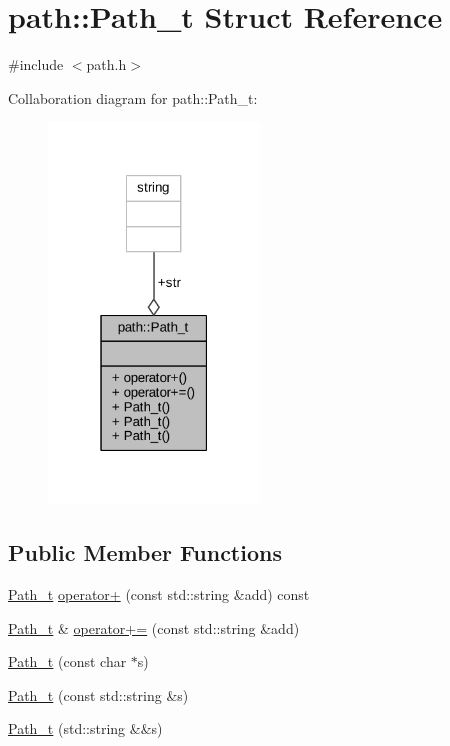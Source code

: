 \hypertarget{structpath_1_1_path__t}{}\section{path\+:\+:Path\+\_\+t Struct Reference}
\label{structpath_1_1_path__t}


{\ttfamily \#include $<$path.\+h$>$}



Collaboration diagram for path\+:\+:Path\+\_\+t\+:
\nopagebreak
\begin{figure}[H]
\begin{center}
\leavevmode
\includegraphics[width=159pt]{structpath_1_1_path__t__coll__graph}
\end{center}
\end{figure}
\subsection*{Public Member Functions}
\begin{DoxyCompactItemize}
\item 
\hyperlink{structpath_1_1_path__t}{Path\+\_\+t} \hyperlink{structpath_1_1_path__t_a1c50adf7865f484afeacfc52edb60033}{operator+} (const std\+::string \&add) const 
\item 
\hyperlink{structpath_1_1_path__t}{Path\+\_\+t} \& \hyperlink{structpath_1_1_path__t_a8fc08de25726a6343c9bb5a66b59eb02}{operator+=} (const std\+::string \&add)
\item 
\hyperlink{structpath_1_1_path__t_ab318e8d160f9e089479b42a50a65f2c0}{Path\+\_\+t} (const char $\ast$s)
\item 
\hyperlink{structpath_1_1_path__t_a288ce6ff255cb73173f6c3f7f8d2a3aa}{Path\+\_\+t} (const std\+::string \&s)
\item 
\hyperlink{structpath_1_1_path__t_a15722c62ddf481f457fb4178532d283a}{Path\+\_\+t} (std\+::string \&\&s)
\end{DoxyCompactItemize}
